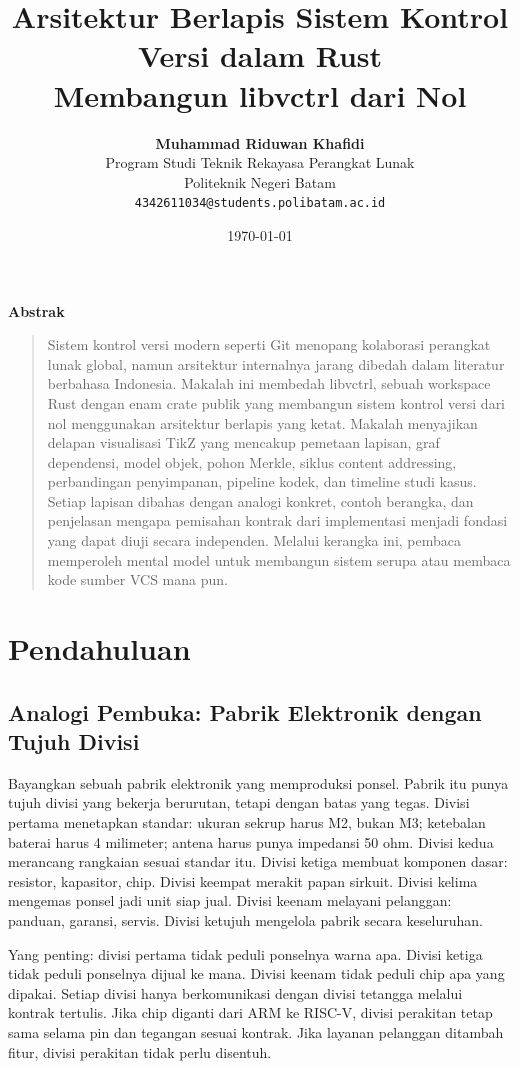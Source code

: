 \documentclass[11pt,a4paper]{article}
\title{\vspace{-1.5cm}\textbf{\sffamily\LARGE Arsitektur Berlapis Sistem Kontrol Versi dalam Rust\\ Membangun libvctrl dari Nol}}
\author{
	\textbf{Muhammad Riduwan Khafidi} \\
	\small Program Studi Teknik Rekayasa Perangkat Lunak \\
	\small Politeknik Negeri Batam \\
	\small \texttt{4342611034@students.polibatam.ac.id}
}
\date{\small\today}
\renewenvironment{abstract}
{\small
	\begin{center}\textbf{\sffamily Abstrak}\end{center}
	\begin{quote}}
	{\end{quote}}
\begin{document}
\maketitle
\thispagestyle{empty}

\begin{abstract}
	Sistem kontrol versi modern seperti Git menopang kolaborasi perangkat lunak global, namun arsitektur internalnya jarang dibedah dalam literatur berbahasa Indonesia. Makalah ini membedah libvctrl, sebuah workspace Rust dengan enam crate publik yang membangun sistem kontrol versi dari nol menggunakan arsitektur berlapis yang ketat. Makalah menyajikan delapan visualisasi TikZ yang mencakup pemetaan lapisan, graf dependensi, model objek, pohon Merkle, siklus content addressing, perbandingan penyimpanan, pipeline kodek, dan timeline studi kasus. Setiap lapisan dibahas dengan analogi konkret, contoh berangka, dan penjelasan mengapa pemisahan kontrak dari implementasi menjadi fondasi yang dapat diuji secara independen. Melalui kerangka ini, pembaca memperoleh mental model untuk membangun sistem serupa atau membaca kode sumber VCS mana pun.
\end{abstract}

\section{Pendahuluan}

\subsection{Analogi Pembuka: Pabrik Elektronik dengan Tujuh Divisi}

Bayangkan sebuah pabrik elektronik yang memproduksi ponsel. Pabrik itu punya tujuh divisi yang bekerja berurutan, tetapi dengan batas yang tegas. Divisi pertama menetapkan standar: ukuran sekrup harus M2, bukan M3; ketebalan baterai harus 4 milimeter; antena harus punya impedansi 50 ohm. Divisi kedua merancang rangkaian sesuai standar itu. Divisi ketiga membuat komponen dasar: resistor, kapasitor, chip. Divisi keempat merakit papan sirkuit. Divisi kelima mengemas ponsel jadi unit siap jual. Divisi keenam melayani pelanggan: panduan, garansi, servis. Divisi ketujuh mengelola pabrik secara keseluruhan.

Yang penting: divisi pertama tidak peduli ponselnya warna apa. Divisi ketiga tidak peduli ponselnya dijual ke mana. Divisi keenam tidak peduli chip apa yang dipakai. Setiap divisi hanya berkomunikasi dengan divisi tetangga melalui kontrak tertulis. Jika chip diganti dari ARM ke RISC-V, divisi perakitan tetap sama selama pin dan tegangan sesuai kontrak. Jika layanan pelanggan ditambah fitur, divisi perakitan tidak perlu disentuh.
\end{document}
